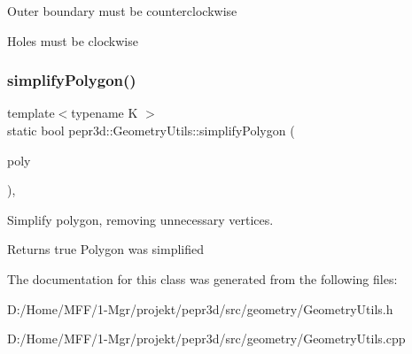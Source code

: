 Outer boundary must be counterclockwise

Holes must be clockwise \mbox{\label{classpepr3d_1_1_geometry_utils_a6fe5d1ec681688da1e249a0f87a4944d}} 
\subsubsection{\texorpdfstring{simplifyPolygon()}{simplifyPolygon()}}
{\footnotesize\ttfamily template$<$typename K $>$ \\
static bool pepr3d\+::\+Geometry\+Utils\+::simplify\+Polygon (\begin{DoxyParamCaption}\item[{C\+G\+A\+L\+::\+Polygon\+\_\+2$<$ K $>$ \&}]{poly }\end{DoxyParamCaption})\hspace{0.3cm}{\ttfamily [inline]}, {\ttfamily [static]}}



Simplify polygon, removing unnecessary vertices. 

\begin{DoxyReturn}{Returns}
true Polygon was simplified 
\end{DoxyReturn}


The documentation for this class was generated from the following files\+:\begin{DoxyCompactItemize}
\item 
D\+:/\+Home/\+M\+F\+F/1-\/\+Mgr/projekt/pepr3d/src/geometry/Geometry\+Utils.\+h\item 
D\+:/\+Home/\+M\+F\+F/1-\/\+Mgr/projekt/pepr3d/src/geometry/Geometry\+Utils.\+cpp\end{DoxyCompactItemize}
